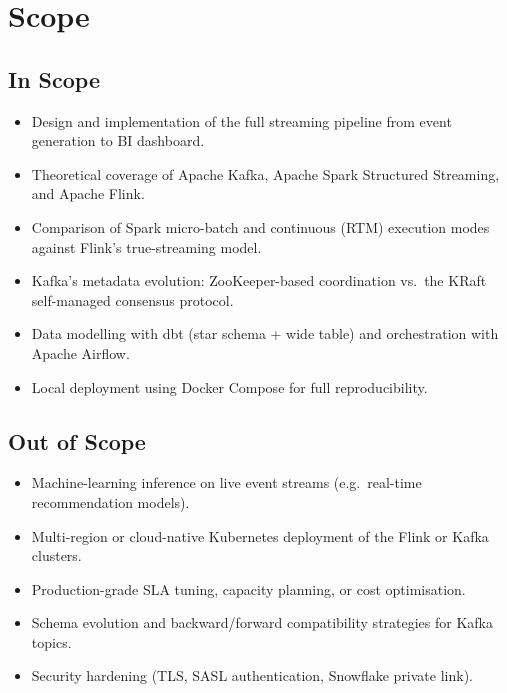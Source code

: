 \section{Scope}

\subsection*{In Scope}
\begin{itemize}
  \item Design and implementation of the full streaming pipeline from event generation to BI dashboard.
  \item Theoretical coverage of Apache Kafka, Apache Spark Structured Streaming, and Apache Flink.
  \item Comparison of Spark micro-batch and continuous (RTM) execution modes against Flink's true-streaming model.
  \item Kafka's metadata evolution: ZooKeeper-based coordination vs.\ the KRaft self-managed consensus protocol.
  \item Data modelling with dbt (star schema + wide table) and orchestration with Apache Airflow.
  \item Local deployment using Docker Compose for full reproducibility.
\end{itemize}

\subsection*{Out of Scope}
\begin{itemize}
  \item Machine-learning inference on live event streams (e.g.\ real-time recommendation models).
  \item Multi-region or cloud-native Kubernetes deployment of the Flink or Kafka clusters.
  \item Production-grade SLA tuning, capacity planning, or cost optimisation.
  \item Schema evolution and backward/forward compatibility strategies for Kafka topics.
  \item Security hardening (TLS, SASL authentication, Snowflake private link).
\end{itemize}
